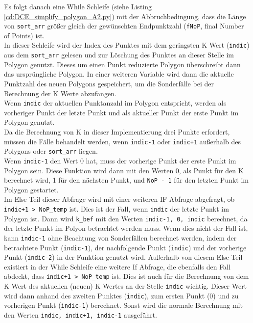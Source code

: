 {	

	Es folgt danach eine While Schleife (siehe Listing \ref{cd:DCE_simplify_polygon_A2.py}) mit der Abbruchbedingung, dass die Länge von \lstinline|sort_arr| größer gleich der gewünschten Endpunktzahl (\lstinline|fNoP|, final Number of Points) ist. \\
	In dieser Schleife wird der Index des Punktes mit dem geringsten K Wert (\lstinline|indic|) aus dem \lstinline|sort_arr| gelesen und zur Löschung des Punktes an dieser Stelle im Polygon genutzt. Dieses um einen Punkt reduzierte Polygon überschreibt dann das ursprüngliche Polygon. In einer weiteren Variable wird dann die aktuelle Punktzahl des neuen Polygons gespeichert, um die Sonderfälle bei der Berechnung der K Werte abzufangen. \\
	
	Wenn \lstinline|indic| der aktuellen Punktanzahl im Polygon entspricht, werden als vorheriger Punkt der letzte Punkt und als aktueller Punkt der erste Punkt im Polygon genutzt. \\
	Da die Berechnung von K in dieser Implementierung drei Punkte erfordert, müssen die Fälle behandelt werden, wenn \lstinline|indic-1| oder \lstinline|indic+1| außerhalb des Polygons oder \lstinline|sort_arr| liegen. \\
	Wenn \lstinline|indic-1| den Wert 0 hat, muss der vorherige Punkt der erste Punkt im Polygon sein. Diese Funktion wird dann mit den Werten 0, als Punkt für den K berechnet wird, 1 für den nächsten Punkt, und \lstinline|NoP - 1| für den letzten Punkt im Polygon gestartet. \\
	Im Else Teil dieser Abfrage wird mit einer weiteren IF Abfrage abgefragt, ob \lstinline|indic+1 > NoP_temp| ist. Dies ist der Fall, wenn \lstinline|indic| der letzte Punkt im Polygon ist. Dann wird \lstinline|k_bef| mit den Werten \lstinline|indic-1, 0, indic| berechnet, da der letzte Punkt im Polyon betrachtet werden muss.
	Wenn dies nicht der Fall ist, kann \lstinline|indic-1| ohne Beachtung von Sonderfällen berechnet werden, indem der betrachtete Punkt (\lstinline|indic-1|), der nachfolgende Punkt (\lstinline|indic|) und der vorherige Punkt (\lstinline|indic-2|) in der Funktion genutzt wird.
	Außerhalb von diesem Else Teil existiert in der While Schleife eine weitere If Abfrage, die ebenfalls den Fall abdeckt, dass \lstinline|indic+1 > NoP_temp| ist. Dies ist auch für die Berechnung von dem K Wert des aktuellen (neuen) K Wertes an der Stelle \lstinline|indic| wichtig. Dieser Wert wird dann anhand des zweiten Punktes (\lstinline|indic|), zum ersten Punkt (0) und zu vorherigen Punkt (\lstinline|indic-1|) berechnet. Sonst wird die normale Berechnung mit den Werten \lstinline|indic, indic+1, indic-1| ausgeführt.

}
